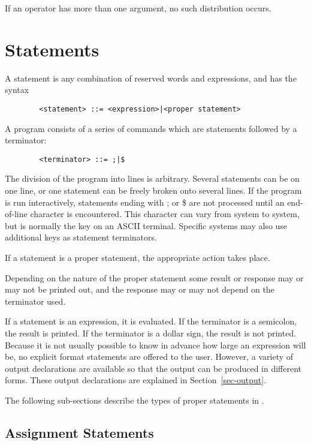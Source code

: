 If an operator has more than one argument, no such distribution occurs.

\chapter{Statements}

A statement is any combination of reserved words and
expressions, and has the syntax 
\begin{verbatim}
        <statement> ::= <expression>|<proper statement>
\end{verbatim}
A {\REDUCE} program consists of a series of commands which are statements
followed by a terminator:
\begin{verbatim}
        <terminator> ::= ;|$
\end{verbatim}
The division of the program into lines is arbitrary. Several statements
can be on one line, or one statement can be freely broken onto several
lines. If the program is run interactively, statements ending with ; or \$
are not processed until an end-of-line character is encountered. This
character can vary from system to system, but is normally the 
key on an ASCII terminal.  Specific systems may also use additional keys
as statement terminators.

If a statement is a proper statement, the
appropriate action takes place.

Depending on the nature of the proper statement some result or response may
or may not be printed out, and the response may or may not depend on the
terminator used.

If a statement is an expression, it is evaluated. If the terminator is a
semicolon, the result is printed. If the terminator is a dollar sign, the
result is not printed. Because it is not usually possible to know in
advance how large an expression will be, no explicit format statements are
offered to the user. However, a variety of output declarations are
available so that the output can be produced in different forms. These
output declarations are explained in Section~\ref{sec-output}.

The following sub-sections describe the types of proper statements
 in {\REDUCE}.

\section{Assignment Statements}

